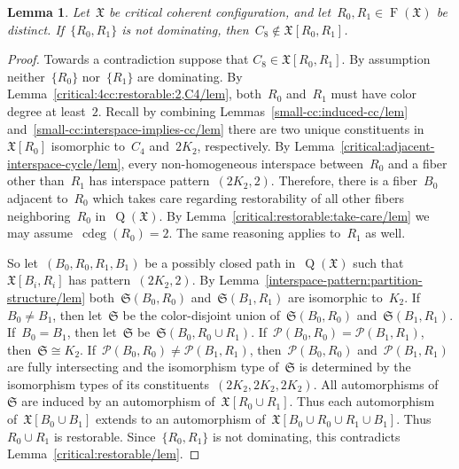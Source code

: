 \documentclass[english,a4paper]{article}
\theoremstyle{plain}
\newtheorem{lemma}      [theorem]{Lemma}
\theoremstyle{definition}
\DeclareMathOperator{\Fibers}{F}
\newcommand{\coherentConfig}{\ensuremath{\mathfrak{X}}}
\newcommand{\fibers}[1]{\ensuremath{\Fibers \left( #1 \right)}}
\newcommand{\interspace}[2]{\ensuremath{\coherentConfig[#1,#2]}}
\newcommand{\inducedCC}[1]{\ensuremath{\coherentConfig[#1]}}
\DeclareMathOperator*{\Quotient}{Q}
\newcommand{\quotientGraph}[1]{\ensuremath{\Quotient(#1)}}
\DeclareMathOperator{\ColorDeg}{cdeg}
\newcommand{\colorDeg}[1]{\ensuremath{\ColorDeg\left(#1\right)}}
\newcommand{\equivalenceClasses}[1]{\ensuremath{\mathcal{P}(#1)}}
\newcommand{\partitionStructure}[1]{\ensuremath{\mathfrak{S}(#1)}}
\newcommand{\ipfourMatching}{\ensuremath{(\disjointCliques{2}{2},2)}}
\newcommand{\clique}[1]{\ensuremath{K_{#1}}}
\newcommand{\cycle}[1]{\ensuremath{C_{#1}}}
\newcommand{\disjointCliques}[2]{\ensuremath{#1 \clique{#2}}}
\begin{document}
\begin{lemma}
\label{critical:4cc:restorable:cycle/lem}
    Let~$\coherentConfig$ be critical coherent configuration, and let~$R_0,R_1 \in \fibers{\coherentConfig}$ be distinct.
    If~$\{R_0 , R_1\}$ is not dominating, then~$\cycle{8} \notin \interspace{R_0}{R_1}$.
\end{lemma}
\begin{proof}
    Towards a contradiction suppose that $\cycle{8} \in \interspace{R_0}{R_1}$.
    By assumption neither~$\{R_0\}$ nor~$\{R_1\}$ are dominating.
    By Lemma~\ref{critical:4cc:restorable:2,C4/lem}, both~$R_0$ and~$R_1$ must have color degree at least~$2$.
    Recall by combining Lemmas~\ref{small-cc:induced-cc/lem} and~\ref{small-cc:interspace-implies-cc/lem} there are two unique constituents in~$\inducedCC{R_0}$ isomorphic to~$\cycle{4}$ and~$\disjointCliques{2}{2}$, respectively.
    By Lemma~\ref{critical:adjacent-interspace-cycle/lem}, every non-homogeneous interspace between~$R_0$ and a fiber other than~$R_1$ has interspace pattern~$\ipfourMatching$.
    Therefore, there is a fiber~$B_0$ adjacent to~$R_0$ which takes care regarding restorability of all other fibers neighboring~$R_0$ in~$\quotientGraph{\coherentConfig}$.
    By Lemma~\ref{critical:restorable:take-care/lem} we may assume~$\colorDeg{R_0} = 2$.
    The same reasoning applies to~$R_1$ as well.

    So let~$(B_0,R_0,R_1,B_1)$ be a possibly closed path in~$\quotientGraph{\coherentConfig}$ such that~$\interspace{B_i}{R_i}$ has pattern~$\ipfourMatching$.
    By Lemma~\ref{interspace-pattern:partition-structure/lem} both~$\partitionStructure{B_0,R_0}$ and~$\partitionStructure{B_1,R_1}$ are isomorphic to~$K_2$.
    If~$B_0 \neq B_1$, then let~$\mathfrak{S}$ be the color-disjoint union of~$\partitionStructure{B_0,R_0}$ and~$\partitionStructure{B_1,R_1}$.
    If~$B_0 = B_1$, then let~$\mathfrak{S}$ be~$\partitionStructure{B_0,R_0 \cup R_1}$.
    If~$\equivalenceClasses{B_0,R_0} = \equivalenceClasses{B_1,R_1}$, then~$\mathfrak{S} \cong K_2$.
    If~$\equivalenceClasses{B_0,R_0} \neq \equivalenceClasses{B_1,R_1}$, then~$\equivalenceClasses{B_0,R_0}$ and~$\equivalenceClasses{B_1,R_1}$ are fully intersecting and the isomorphism type of~$\mathfrak{S}$ is determined by the isomorphism types of its constituents~$(2K_2,2K_2,2K_2)$.
    All automorphisms of~$\mathfrak{S}$ are induced by an automorphism of~$\inducedCC{R_0 \cup R_1}$.
    Thus each automorphism of~$\inducedCC{ B_0 \cup B_1 }$ extends to an automorphism of~$\inducedCC{ B_0 \cup R_0 \cup R_1 \cup B_1 }$. Thus $R_0 \cup R_1$ is restorable.
    Since~$\{R_0, R_1\}$ is not dominating, this contradicts Lemma~\ref{critical:restorable/lem}.
\end{proof}
\end{document}
